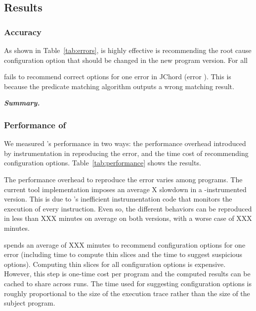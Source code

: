 \subsection{Results}

\subsubsection{Accuracy}
\label{sec:accuracy}

As shown in Table~\ref{tab:errors}, \ourtool is highly effective
is recommending the root cause configuration option that should
be changed in the new program version. For all 


\ourtool fails to recommend correct options for one error in
JChord (error ). This is because the predicate matching
algorithm outputs a wrong matching result.


\vspace{1mm}

\noindent \textbf{\textit{Summary.}}

\subsubsection{Performance of \ourtool}
\label{sec:timecost}

We measured \ourtool's performance in two ways:
the performance overhead introduced by instrumentation
in reproducing the error, and the time cost
of recommending configuration options.
Table~\ref{tab:performance} shows the results.

The performance overhead to reproduce the error
varies among programs. The current tool implementation
imposes an average X slowdown in a
\ourtool-instrumented version. This is due to
\ourtool's inefficient instrumentation code that
monitors the execution of every instruction.
Even so, the different behaviors can be reproduced
in less than XXX minutes on average on both versions, 
with a worse case of XXX minutes.


\ourtool spends an average of XXX minutes
to recommend configuration options for one
error (including time to compute thin slices
and the time to suggest suspicious options). 
Computing thin slices for all configuration options
is expensive. However, this step is one-time cost
per program and the computed results can
be cached to share across runs. 
The time used for suggesting configuration options
is roughly proportional to the size of the execution trace
rather than the size of the subject program.

